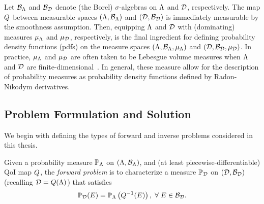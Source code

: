 Let $\mathcal{B}_{{\Lambda}}$ and $\mathcal{B}_{\mathcal{D}}$ denote (the Borel) $\sigma$-algebras on ${\Lambda}$ and $\mathcal{D}$, respectively.
The map $Q$ between measurable spaces $({\Lambda}, \mathcal{B}_{{\Lambda}})$ and $(\mathcal{D}, \mathcal{B}_{\mathcal{D}})$ is immediately measurable by the smoothness assumption.
Then, equipping ${\Lambda}$ and $\mathcal{D}$ with (dominating) measures $\mu_{{\Lambda}}$ and $\mu_{\mathcal{D}}$, respectively, is the final ingredient for defining probability density functions (pdfs) on the measure spaces $({\Lambda}, \mathcal{B}_{{\Lambda}}, \mu_{{\Lambda}})$ and $(\mathcal{D}, \mathcal{B}_{\mathcal{D}}, \mu_{\mathcal{D}})$.
In practice, $\mu_{{\Lambda}}$ and $\mu_{\mathcal{D}}$ are often taken to be Lebesgue volume measures when ${\Lambda}$ and $\mathcal{D}$ are finite-dimensional~\cite{BET+14, BJW18}.
In general, these measure allow for the description of probability measures as probability density functions defined by Radon-Nikodym derivatives.


\subsection{Problem Formulation and Solution}

We begin with defining the types of forward and inverse problems considered in this thesis.

\begin{defn}\label{defn:forward-problem}
  Given a probability measure $\mathbb{P}_{\Lambda}$ on $({\Lambda}, \mathcal{B}_{{\Lambda}})$, and (at least piecewise-differentiable) QoI map $Q$, the \emph{forward problem} is to characterize a measure $\mathbb{P}_{\mathcal{D}}$ on $(\mathcal{D}, \mathcal{B}_{\mathcal{D}})$ (recalling $\mathcal{D} = Q({\Lambda})$) that satisfies
  \begin{equation}\label{eq:forward-problem}
    \mathbb{P}_{\mathcal{D}} (E) = \mathbb{P}_{\Lambda} \left ( Q^{-1}(E) \right ), \; \forall \; E \in \mathcal{B}_{\mathcal{D}}.
  \end{equation}
\end{defn}

